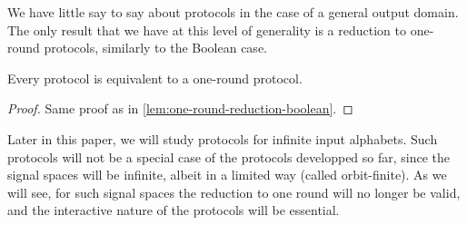 We have little say to say about  protocols in the case of a general output domain. The  only result that we have at this level of generality is a reduction to one-round protocols, similarly to the Boolean case.       \begin{lemma}\label{lemma:one-round-reduction-general}
        Every protocol is equivalent to a one-round protocol.
 \end{lemma}
 \begin{proof}
    Same proof as in \cref{lem:one-round-reduction-boolean}. 
 \end{proof}

 Later in this paper, we will study protocols for infinite input alphabets. Such protocols will not be a special case of the protocols developped so far, since the signal spaces will be infinite, albeit in a limited way (called orbit-finite).  As we will see, for such signal spaces the reduction to one round will no longer be valid, and the interactive nature of the protocols will be essential.